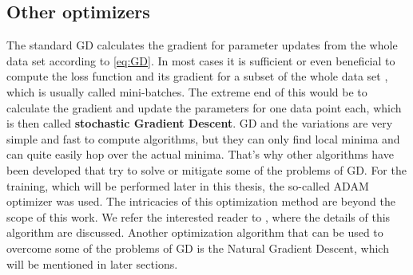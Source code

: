 \subsection{Other optimizers}
The standard GD calculates the gradient for parameter updates from the whole data set according to \cref{eq:GD}. In most cases it is sufficient or even beneficial to compute the loss function and its gradient for a subset of the whole data set \cite{SGDLocalMinima}, which is usually called mini-batches. The extreme end of this would be to calculate the gradient and update the parameters for one data point each, which is then called \textbf{stochastic Gradient Descent}.
GD and the variations are very simple and fast to compute algorithms, but they can only find local minima and can quite easily hop over the actual minima. That's why other algorithms have been developed that try to solve or mitigate some of the problems of GD. For the training, which will be performed later in this thesis, the so-called ADAM optimizer was used. The intricacies of this optimization method are beyond the scope of this work. We refer the interested reader to \cite{adamPaper}, where the details of this algorithm are discussed. Another optimization algorithm that can be used to overcome some of the problems of GD is the Natural Gradient Descent, which will be mentioned in later sections.


